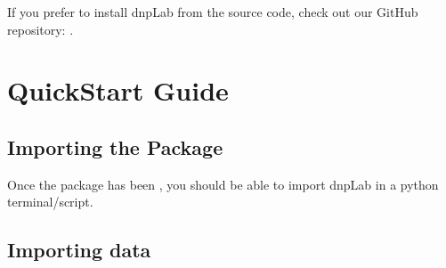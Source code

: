 \documentclass[letterpaper,10pt,english]{sphinxmanual}
\begin{document}
If you prefer to install dnpLab from the source code, check out our GitHub repository: .


\section{Quick\sphinxhyphen{}Start Guide}
\label{\detokenize{quick-start:quick-start-guide}}\label{\detokenize{quick-start::doc}}

\subsection{Importing the Package}
\label{\detokenize{quick-start:importing-the-package}}
Once the package has been {\hyperref[\detokenize{install:installing}]{}}, you should be able to import dnpLab in a python terminal/script.

\begin{sphinxVerbatim}[commandchars=\\\{\}]
   
\end{sphinxVerbatim}


\subsection{Importing data}
\label{\detokenize{quick-start:importing-data}}
\begin{sphinxVerbatim}[commandchars=\\\{\}]
   

  
  

   
\end{sphinxVerbatim}
\end{document}
